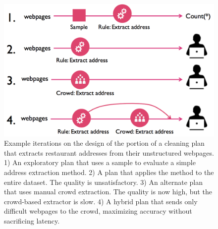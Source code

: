 \begin{figure}[t]
\centering
\vspace{-0.5cm}
\includegraphics[width = .4\textwidth]{figs/lifecycle.png}
\vspace{-0.4cm}
\caption{Example iterations on the design of the portion of a cleaning plan that extracts restaurant addresses from their unstructured webpages.  
1) An exploratory plan that uses a sample to evaluate a simple address extraction method.
2) A plan that applies the method to the entire dataset. The quality is unsatisfactory. 
3) An alternate plan that uses manual crowd extraction. The quality is now high, but the crowd-based extractor is slow. 
4) A hybrid plan that sends only difficult webpages to the crowd, maximizing accuracy without sacrificing latency.}
\label{fig:ex-plan}
\vspace{-0.3cm}
\end{figure}


